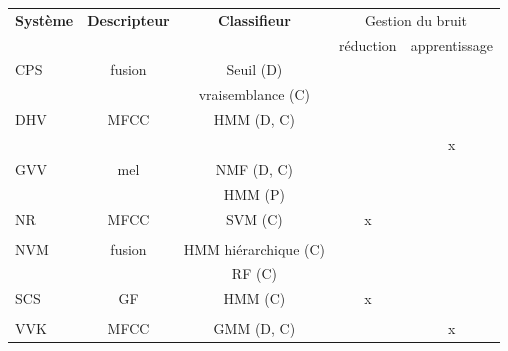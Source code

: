 \begin{table}[t]
\begin{center}
\tiny
\begin{tabular}{lcccc}
\textbf{Système}                    & \textbf{Descripteur} & \textbf{Classifieur}         & \multicolumn{2}{c}{Gestion du bruit}  \\ 
                                    &                      &                              & réduction & apprentissage  \\ 
\hline
CPS                                 & fusion               & Seuil \hfill (D)             &           &             \\ 
\citep{CPS}                         &                      & vraisemblance \hfill (C)     &           &             \\ 
\hline         
DHV                                 & MFCC                 & HMM \hfill  (D, C)           &           &              \\ 
\citep{diment2013sound,DHV}         &                      &                              &           & x            \\ 
\hline 
GVV                                 & mel                  & NMF \hfill  (D, C)           &           &              \\
\citep{gemmeke2013exemplar,GVV}     &                      & HMM \hfill  (P)              &           &             \\                      
\hline
NR                                  & MFCC                 & SVM \hfill   (C)             & x         &             \\
\citep{roma2013recurrence,NR2}      &                      &                              &           &             \\    
\hline
NVM                                 & fusion               & HMM hiérarchique \hfill  (C) &           &            \\     
\citep{niessen2013hierarchical,NVM} &                      & RF  \hfill (C)               &           &            \\     
\hline
SCS                                 & GF                   & HMM \hfill  (C)              & x         &               \\  
\citep{schroder2013use,SCS}         &                      &                              &           &             \\    
\hline  
VVK                                 & MFCC                 & GMM \hfill  (D, C)           &           & x            \\ 

\end{tabular}
\end{center}
\end{table}

